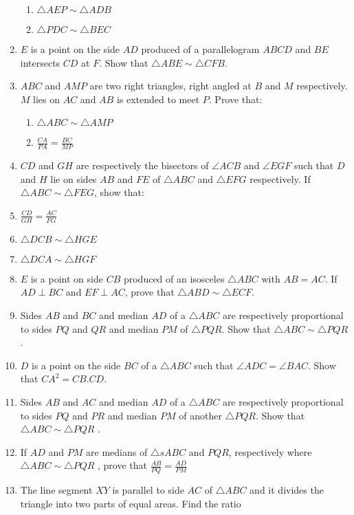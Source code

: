 \begin{enumerate}[label=\thesection.\arabic*.,ref=\thesection.\theenumi]
\begin{enumerate}
\item   $\triangle  AEP  \sim   \triangle  ADB$
 \item  $\triangle  PDC  \sim   \triangle  BEC$
\end{enumerate}
%
\item  $E$ is a point on the side $AD$ produced of a parallelogram $ABCD$ and $BE$ intersects $CD$ at $F$. Show that  $\triangle  ABE  \sim   \triangle  CFB$.
\item  $ABC$ and $AMP$ are two right triangles, right angled at $B$ and $M$ respectively. $M$ lies on $AC$ and $AB$ is extended to meet $P$. Prove that: 
\begin{enumerate}
\item   $\triangle  ABC  \sim   \triangle  AMP$
\item  $\frac{CA}{PA} = \frac{BC}{  MP}$
\end{enumerate}
%
\item  $CD$ and $GH$ are respectively the bisectors of  $\angle  ACB$ and  $\angle  EGF$ such that $D$ and $H$ lie on sides $AB$ and $FE$ of  $\triangle  ABC$ and  $\triangle  EFG$ respectively. If  $\triangle  ABC  \sim   \triangle  FEG$, show that:
\item  $\frac{CD}{GH} = \frac{ AC}{  FG}$
\item  $ \triangle  DCB  \sim   \triangle  HGE$
 \item  $ \triangle  DCA  \sim   \triangle  HGF$
\item  $E$ is a point on side $CB$ produced of an isosceles $\triangle ABC$ with $AB = AC$. If $AD  \perp  BC$ and $EF  \perp  AC$, prove that  $\triangle  ABD  \sim   \triangle  ECF$.
\item  Sides $AB$ and $BC$ and median $AD$ of a $\triangle ABC$ are respectively proportional to sides  $PQ$  and $QR$ and median $PM$ of  $\triangle PQR$. Show that  $\triangle  ABC  \sim  \triangle PQR$ .
\item  $D$ is a point on the side $BC$ of a $\triangle ABC$ such that  $\angle  ADC =  \angle  BAC$. Show that $CA^2 = CB.CD$.
\item  Sides $AB$ and $AC$ and median $AD$ of a $\triangle ABC$ are respectively proportional to sides $PQ$ and $PR$ and median $PM$ of another $\triangle PQR$. Show that  $\triangle  ABC  \sim   \triangle PQR$ .%
\item  If $AD$ and $PM$ are medians of $\triangle s ABC$ and $PQR$, respectively where  $\triangle  ABC  \sim   \triangle PQR$ , prove that
$\frac{AB}{ PQ} = \frac{AD}{  PM}$
\item The line segment $XY$ is parallel to side $AC$ of  $\triangle  ABC$ and it divides the triangle into two parts of equal areas. Find the ratio

\end{enumerate}
